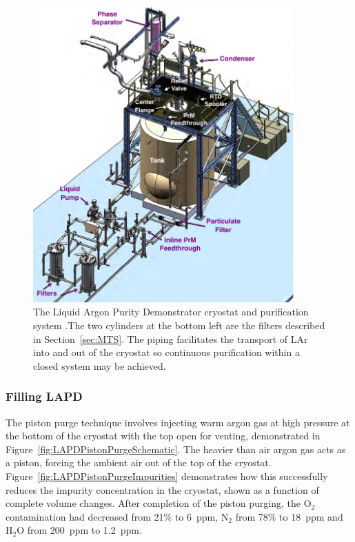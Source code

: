\begin{figure}
  \centering
  \includegraphics[width=10cm]{LAPD.pdf}
  \caption[The Liquid Argon Purity Demonstrator cryostat and purification system.]{The Liquid Argon Purity Demonstrator cryostat and purification system \cite{LAPDJINST2014}.The two cylinders at the bottom left are the filters described in Section~\ref{sec:MTS}.  The piping facilitates the transport of LAr into and out of the cryostat so continuous purification within a closed system may be achieved.}
  \label{fig:LAPD}
\end{figure}

\subsubsection{Filling LAPD}\label{sec:FillingLAPD}

The piston purge technique involves injecting warm argon gas at high pressure at the bottom of the cryostat with the top open for venting, demonstrated in Figure~\ref{fig:LAPDPistonPurgeSchematic}.  The heavier than air argon gas acts as a piston, forcing the ambient air out of the top of the cryostat.  Figure~\ref{fig:LAPDPistonPurgeImpurities} demonstrates how this successfully reduces the impurity concentration in the cryostat, shown as a function of complete volume changes.  After completion of the piston purging, the O$_2$ contamination had decreased from 21\% to 6~ppm, N$_2$ from 78\% to 18~ppm and H$_2$O from 200~ppm to 1.2~ppm.

